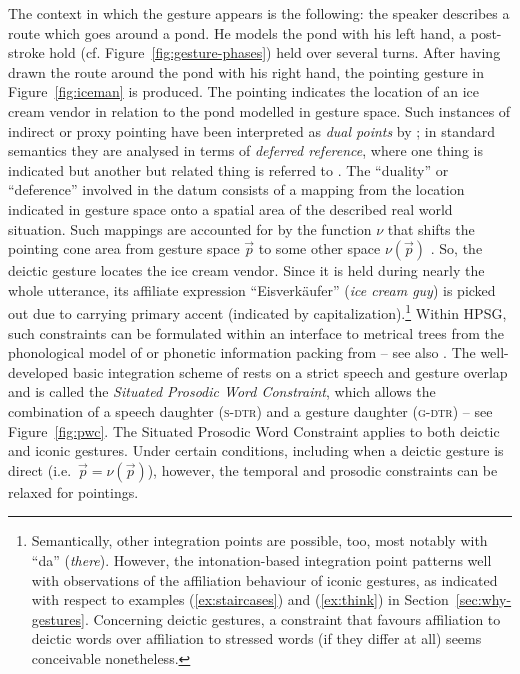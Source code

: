 \documentclass[output=paper]{langsci/langscibook}
\begin{document}
The context in which the gesture appears is the following: the speaker describes a route which goes around a pond. 
%
He models the pond with his left hand, a post-stroke hold (cf. Figure~\ref{fig:gesture-phases}) held over several turns.
%
After having drawn the route around the pond with his right hand, the pointing gesture in Figure~\ref{fig:iceman} is produced.
%
The pointing indicates the location of an ice cream vendor in relation to the pond modelled in gesture space. 
%
Such instances of indirect or proxy pointing  have been interpreted as \emph{dual points}  by \citet{Goodwin:2003}; in standard semantics they are analysed in terms of \emph{deferred reference},  where one thing is indicated but another but related thing is referred to \citep{Quine:1950,Nunberg:1993}. 
%
The \enquote{duality} or \enquote{deference} involved in the datum consists of a mapping from the location indicated in gesture space onto a spatial area of the described real world situation.
%
Such mappings are accounted for by the function $\nu$ that shifts the pointing cone area from gesture space $\vec{p}$ to some other space $\nu(\vec{p})$ \citep{Lascarides:Stone:2009:a}.
%
So, the deictic gesture locates the ice cream vendor. 
%
Since it is held during nearly the whole utterance, its affiliate expression \enquote{Eisverkäufer} (\textit{ice cream guy}) is picked out due to carrying primary accent (indicated by capitalization).\footnote{Semantically, other integration points are possible, too, most notably with \enquote{da} (\textit{there}). However, the intonation-based integration point patterns well with observations of the affiliation behaviour of iconic gestures, as indicated with respect to examples (\ref{ex:staircases}) and (\ref{ex:think}) in Section~\ref{sec:why-gestures}. Concerning deictic gestures, a constraint that favours affiliation to deictic words over affiliation to stressed words (if they differ at all) seems conceivable nonetheless.}
%
Within HPSG, such constraints can be formulated within an interface to metrical trees from the phonological model of \citet{Klein:2000} or phonetic information packing from \citet{Engdahl:Vallduvi:1996} -- see also .
%
The well-developed basic integration scheme of \citet[]{Alahverdzhieva:Lascarides:Flickinger:2017} rests on a strict speech and gesture overlap and is called the \emph{Situated Prosodic Word Constraint},  which allows the combination of a speech daughter (\textsc{s-dtr})  and a gesture daughter (\textsc{g-dtr})  -- see Figure~\ref{fig:pwc}.
%
The Situated Prosodic Word Constraint applies to both deictic and iconic gestures.
%
Under certain conditions, including when a deictic gesture is direct (i.e.\ $\vec{p} = \nu(\vec{p})$), however, the temporal and prosodic constraints can be relaxed for pointings.  
\end{document}
